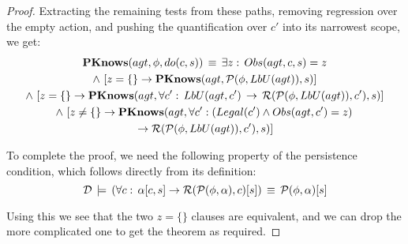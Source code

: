 \begin{proof}
Extracting the remaining tests from these paths, removing regression
over the empty action, and pushing the quantification over $c'$ into
its narrowest scope, we get:\begin{multline*}
\mathbf{PKnows}(agt,\phi,do(c,s))\,\equiv\,\exists z:\, Obs(agt,c,s)=z\\
\wedge\,\left[z=\{\}\rightarrow\mathbf{PKnows}(agt,\mathcal{P}(\phi,LbU(agt)),s)\right]\\
\wedge\,\left[z=\{\}\rightarrow\mathbf{PKnows}(agt,\forall c':\, LbU(agt,c')\,\rightarrow\,\mathcal{R}(\mathcal{P}(\phi,LbU(agt)),c'),s)\right]\\
\wedge\,\left[z\neq\{\}\rightarrow\mathbf{PKnows}(agt,\forall c':\left(Legal(c')\wedge Obs(agt,c')=z\right)\right.\\
\left.\rightarrow\mathcal{R}(\mathcal{P}(\phi,LbU(agt)),c'),s)\right]\end{multline*}


To complete the proof, we need the following property of the persistence
condition, which follows directly from its definition:\[
\mathcal{D}\,\models\,\left(\forall c:\,\alpha[c,s]\rightarrow\mathcal{R}(\mathcal{P}(\phi,\alpha),c)[s]\right)\,\equiv\,\mathcal{P}(\phi,\alpha)[s]\]


Using this we see that the two $z=\{\}$ clauses are equivalent, and
we can drop the more complicated one to get the theorem as required. 
\end{proof}
\medskip{}


